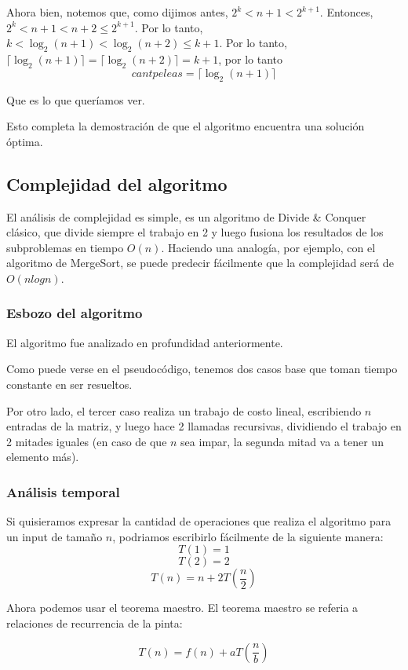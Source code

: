 Ahora bien, notemos que, como dijimos antes, $2^k < n + 1 < 2^{k+1}$. Entonces, $2^k < n + 1 < n + 2 \leq 2^{k+1}$. Por lo tanto, $k < \log_2(n + 1) < \log_2(n + 2) \leq k +1$. Por lo tanto, $\lceil \log _2 (n+1) \rceil = \lceil \log _2 (n+2) \rceil = k + 1$, por lo tanto 
\[cantpeleas = \lceil \log _2 (n+1) \rceil\]

Que es lo que queríamos ver.

Esto completa la demostración de que el algoritmo encuentra una solución óptima.

\subsection{Complejidad del algoritmo}

El análisis de complejidad es simple, es un algoritmo de Divide \& Conquer clásico, que divide siempre el trabajo en 2 y luego fusiona los resultados de los subproblemas en tiempo $O(n)$. Haciendo una analogía, por ejemplo, con el algoritmo de MergeSort, se puede predecir fácilmente que la complejidad será de $O(nlogn)$.

\subsubsection{Esbozo del algoritmo}

El algoritmo fue analizado en profundidad anteriormente. 

Como puede verse en el pseudocódigo, tenemos dos casos base que toman tiempo constante en ser resueltos.

Por otro lado, el tercer caso realiza un trabajo de costo lineal, escribiendo $n$ entradas de la matriz, y luego hace 2 llamadas recursivas, dividiendo el trabajo en 2 mitades iguales (en caso de que $n$ sea impar, la segunda mitad va a tener un elemento más).

\subsubsection{Análisis temporal}
Si quisieramos expresar la cantidad de operaciones que realiza el algoritmo para un input de tamaño $n$, podriamos escribirlo fácilmente de la siguiente manera:
\[T(1) = 1\]
\[T(2) = 2\]
\[T(n) = n + 2 T \left(\frac{n}{2}\right)\]

Ahora podemos usar el teorema maestro. El teorema maestro se referia a relaciones de recurrencia de la pinta:

\[T(n) = f(n) + a T\left(\frac{n}{b}\right)\]

